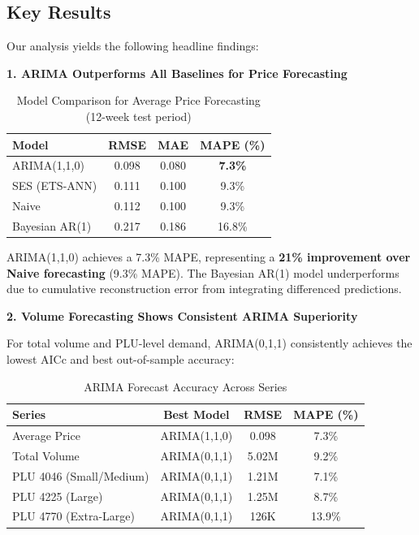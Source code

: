 \documentclass[12pt]{article}
\begin{document}
\subsection{Key Results}

Our analysis yields the following headline findings:

\textbf{1. ARIMA Outperforms All Baselines for Price Forecasting}

\begin{table}[H]
\centering
\caption{Model Comparison for Average Price Forecasting (12-week test period)}
\begin{tabular}{lccc}
\toprule
\textbf{Model} & \textbf{RMSE} & \textbf{MAE} & \textbf{MAPE (\%)} \\
\midrule
ARIMA(1,1,0) & 0.098 & 0.080 & \textbf{7.3\%} \\
SES (ETS-ANN) & 0.111 & 0.100 & 9.3\% \\
Naive & 0.112 & 0.100 & 9.3\% \\
Bayesian AR(1) & 0.217 & 0.186 & 16.8\% \\
\bottomrule
\end{tabular}
\label{tab:price-comparison}
\end{table}

ARIMA(1,1,0) achieves a 7.3\% MAPE, representing a \textbf{21\% improvement over Naive forecasting} (9.3\% MAPE). The Bayesian AR(1) model underperforms due to cumulative reconstruction error from integrating differenced predictions.

\textbf{2. Volume Forecasting Shows Consistent ARIMA Superiority}

For total volume and PLU-level demand, ARIMA(0,1,1) consistently achieves the lowest AICc and best out-of-sample accuracy:

\begin{table}[H]
\centering
\caption{ARIMA Forecast Accuracy Across Series}
\begin{tabular}{lccc}
\toprule
\textbf{Series} & \textbf{Best Model} & \textbf{RMSE} & \textbf{MAPE (\%)} \\
\midrule
Average Price & ARIMA(1,1,0) & 0.098 & 7.3\% \\
Total Volume & ARIMA(0,1,1) & 5.02M & 9.2\% \\
PLU 4046 (Small/Medium) & ARIMA(0,1,1) & 1.21M & 7.1\% \\
PLU 4225 (Large) & ARIMA(0,1,1) & 1.25M & 8.7\% \\
PLU 4770 (Extra-Large) & ARIMA(0,1,1) & 126K & 13.9\% \\
\bottomrule
\end{tabular}
\label{tab:all-accuracy}
\end{table}
\end{document}
